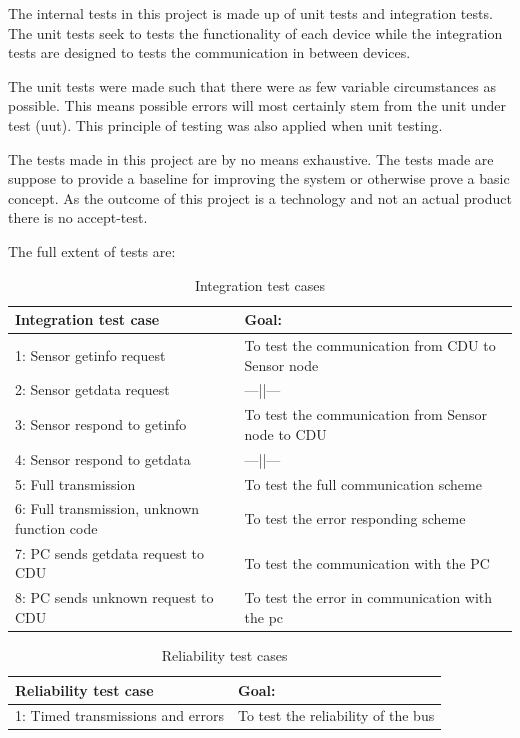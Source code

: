 The internal tests in this project is made up of unit tests and integration tests. The unit tests seek to tests the functionality of each device while the integration tests are designed to tests the communication in between devices.

The unit tests were made such that there were as few variable circumstances as possible. This means possible errors will most certainly stem from the unit under test (uut). This principle of testing was also applied when unit testing.

The tests made in this project are by no means exhaustive. The tests made are suppose to provide a baseline for improving the system or otherwise prove a basic concept. As the outcome of this project is a technology and not an actual product there is no accept-test.

The full extent of tests are:\\
\begin{table}[H]
	\centering
    \begin{tabular}{|p{6.5cm}|p{7.5cm}|}
    \hline
    Integration test case                       & Goal: \\ \hline
    1: Sensor getinfo request                   & To test the communication from CDU to Sensor node\\ \hline
    2: Sensor getdata request                   & ---||--- \\ \hline
    3: Sensor respond to getinfo                & To test the communication from Sensor node to CDU\\ \hline
    4: Sensor respond to getdata                & ---||--- \\ \hline
    5: Full transmission                        & To test the full communication scheme     \\ \hline
    6: Full transmission, unknown function code & To test the error responding scheme     \\ \hline 
    7: PC sends getdata request to CDU          & To test the communication with the PC     \\ \hline
    8: PC sends unknown request to CDU          & To test the error in communication with the pc\\ \hline
    \end{tabular}
    \caption{Integration test cases}
    \label{tab:intetestcas}
\end{table}
\begin{table}[H]
	\centering
    \begin{tabular}{|p{6.5cm}|p{7.5cm}|}
    \hline
    Reliability test case                             & Goal: \\ \hline
    1: Timed transmissions and errors                 & To test the reliability of the bus \\ \hline
    \end{tabular}
    \caption{Reliability test cases}
    \label{tab:reliability}
\end{table}

